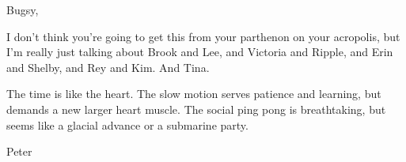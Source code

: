 

Bugsy,

I don't think you're going to get this from your parthenon on your
acropolis, but I'm really just talking about Brook and Lee, and
Victoria and Ripple, and Erin and Shelby, and Rey and Kim.  And Tina.

The time is like the heart.  The slow motion serves patience and
learning, but demands a new larger heart muscle.  The social ping pong
is breathtaking, but seems like a glacial advance or a submarine
party.

Peter


\bye
